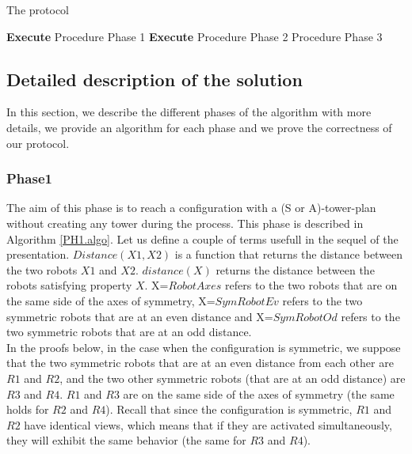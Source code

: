 \documentclass[12pt]{llncs}
\begin{document}
\begin{algorithm}[H]
 \caption{The protocol}
  \label{GenAlgo.algo}
 \begin{algorithmic}[1]

         \State \textbf{Execute} Procedure Phase 1
     \Else
         \State  \textbf{Execute} Procedure Phase 2
      \Else 
            Procedure Phase 3
      \EndIf
\EndIf
\EndIf
\end{algorithmic}
\end{algorithm}

\subsection{\textbf{Detailed description of the solution}}

In this section, we describe the different phases of the algorithm with more details, we provide an algorithm for each phase and we prove the correctness of our protocol.
\subsubsection{\textbf{Phase1}}
The aim of this phase is to reach a configuration with a (S or A)-tower-plan without creating any tower during the process. This phase is described in Algorithm \ref{PH1.algo}. Let us 
define a couple of terms usefull in the sequel of the presentation. $Distance(X1,X2)$ is a function that returns the distance between the two robots $X1$ and $X2$. $distance(X)$ returns the distance between the robots satisfying property $X$. X=$RobotAxes$ refers to the two robots that are on the same side of the axes of symmetry, X=$SymRobotEv$ refers to the two symmetric robots that are at an even distance and X=$SymRobotOd$ refers to the two symmetric robots that are at an odd distance.\\

In the proofs below, in the case when the configuration is symmetric, we suppose that the two symmetric robots that are at an even distance from each other are $R1$ and $R2$, and the two other symmetric robots (that are at an odd distance) are $R3$ and $R4$. $R1$ and $R3$ are on the same side of the axes of symmetry (the same holds for $R2$ and $R4$). Recall that since the configuration is symmetric, $R1$ and $R2$ have identical views, which means that if they are activated simultaneously, they will exhibit the same behavior (the same for $R3$ and $R4$).
\end{document}
